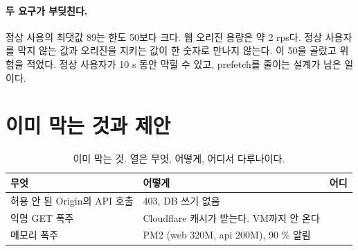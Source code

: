 \paragraph{두 요구가 부딪친다.}
정상 사용의 최댓값 89는 한도 50보다 크다.
웹 오리진 용량은 약 2 rps다.
정상 사용자를 막지 않는 값과 오리진을 지키는 값이 한 숫자로 만나지 않는다.
이 50을 골랐고 위험을 적었다.
정상 사용자가 10 s 동안 막힐 수 있고, prefetch를 줄이는 설계가 남은 일이다.

\section{이미 막는 것과 제안}\label{sec:bl-existing}

\begin{table}[H]
  \caption{이미 막는 것. 열은 무엇, 어떻게, 어디서 다루나이다.}
  \label{tab:bl-existing}
  \centering\small
  \begin{tabularx}{\linewidth}{@{}L{4.0cm}Y L{2.2cm}@{}}
    \toprule
    무엇 & 어떻게 & 어디 \\
    \midrule
    허용 안 된 Origin의 API 호출 & 403, DB 쓰기 없음 &  \\
    \midrule
    익명 GET 폭주 & Cloudflare 캐시가 받는다. VM까지 안 온다 &  \\
    \midrule
    메모리 폭주 & PM2 (web 320M, api 200M), 90 \% 알림 &  \\
    \bottomrule
  \end{tabularx}
\end{table}

